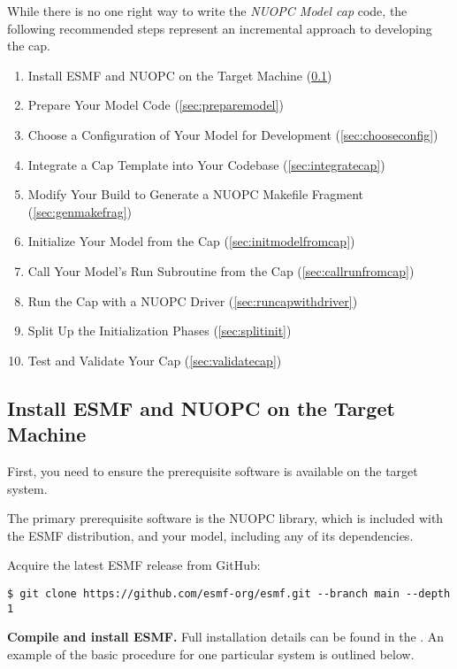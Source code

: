 
\label{sec:approach}

While there is no one right way to write the \emph{NUOPC Model cap} code, the following
recommended steps represent an incremental approach to developing the cap.
\begin{enumerate}
\item Install ESMF and NUOPC on the Target Machine (\ref{sec:installesmf})
\item Prepare Your Model Code (\ref{sec:preparemodel})
\item Choose a Configuration of Your Model for Development (\ref{sec:chooseconfig})
\item Integrate a Cap Template into Your Codebase (\ref{sec:integratecap})
\item Modify Your Build to Generate a NUOPC Makefile Fragment (\ref{sec:genmakefrag})
\item Initialize Your Model from the Cap (\ref{sec:initmodelfromcap})
\item Call Your Model's Run Subroutine from the Cap (\ref{sec:callrunfromcap})
\item Run the Cap with a NUOPC Driver (\ref{sec:runcapwithdriver})
\item Split Up the Initialization Phases (\ref{sec:splitinit})
\item Test and Validate Your Cap (\ref{sec:validatecap})
\end{enumerate}

\subsection{Install ESMF and NUOPC on the Target Machine}
\label{sec:installesmf}
First, you need to ensure the prerequisite
software is available on the target system.

The primary prerequisite software is the NUOPC library, which is
included with the ESMF distribution, and your model, including
any of its dependencies.

Acquire the latest ESMF release from GitHub:

\begin{verbatim}
$ git clone https://github.com/esmf-org/esmf.git --branch main --depth 1
\end{verbatim}

\textbf{Compile and install ESMF.}  Full installation details can be found in the .  An example of the basic procedure
for one particular system is outlined below.


